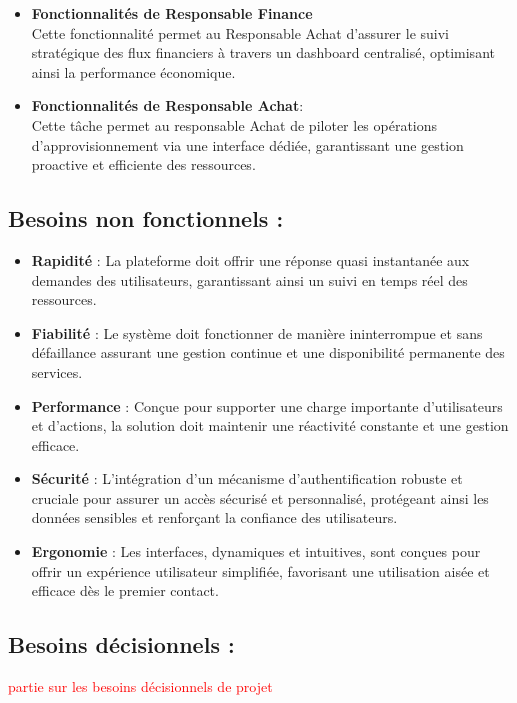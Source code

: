 \documentclass[a4paper,11pt]{report}
\begin{document}
\begin{itemize}
\begin{itemize}
\end{itemize}
\item \textbf{Fonctionnalités de Responsable Finance} \\
Cette fonctionnalité permet au Responsable Achat d'assurer le suivi stratégique des flux financiers à travers un dashboard centralisé, optimisant ainsi la performance économique.

\item \textbf{Fonctionnalités de Responsable Achat}:\\
Cette tâche permet au responsable Achat de piloter les opérations d'approvisionnement via une interface dédiée, garantissant une gestion proactive et efficiente des ressources.\\
\end{itemize}

\subsection{Besoins non fonctionnels :}
\begin{itemize}[label = --]
	\item \textbf{Rapidité} : La plateforme doit offrir une réponse quasi instantanée aux demandes des utilisateurs, garantissant ainsi un suivi en temps réel des ressources.
	\item \textbf{Fiabilité} : Le système doit fonctionner de manière ininterrompue et sans défaillance assurant une gestion continue et une disponibilité permanente des services.
	\item \textbf{Performance} : Conçue pour supporter une charge importante d'utilisateurs et d'actions, la solution doit maintenir une réactivité constante et une gestion efficace.
	\item \textbf{Sécurité} : L'intégration d'un mécanisme d'authentification robuste et cruciale pour assurer un accès sécurisé et personnalisé, protégeant ainsi les données sensibles et renforçant la confiance des utilisateurs. 
	\item \textbf{Ergonomie} : Les interfaces, dynamiques et intuitives, sont conçues pour offrir un expérience utilisateur simplifiée, favorisant une utilisation aisée et efficace dès le premier contact.
\end{itemize}
\newpage
\subsection{Besoins décisionnels :}

\textcolor{red}{partie sur les besoins décisionnels de projet }
\end{document}
